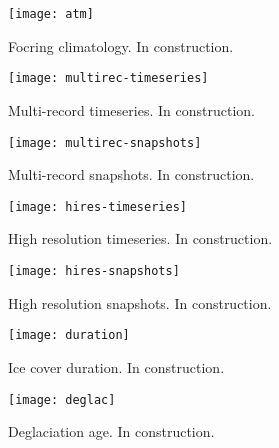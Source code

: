 \documentclass[tc, ms]{copernicus}
\begin{document}
\begin{figure}
  \texttt{[image: atm]}
  \caption{Focring climatology. In construction.}
  \label{fig:atm}
\end{figure}

\begin{figure}
  \texttt{[image: multirec-timeseries]}
  \caption{Multi-record timeseries. In construction.}
  \label{fig:multirec-timeseries}
\end{figure}

\begin{figure}
  \texttt{[image: multirec-snapshots]}
  \caption{Multi-record snapshots. In construction.}
  \label{fig:multirec-snapshots}
\end{figure}

\begin{figure}
  \texttt{[image: hires-timeseries]}
  \caption{High resolution timeseries. In construction.}
  \label{fig:hires-timeseries}
\end{figure}

\begin{figure}
  \texttt{[image: hires-snapshots]}
  \caption{High resolution snapshots. In construction.}
  \label{fig:hires-snapshots}
\end{figure}

\begin{figure}
  \texttt{[image: duration]}
  \caption{Ice cover duration. In construction.}
  \label{fig:duration}
\end{figure}

\begin{figure}
  \texttt{[image: deglac]}
  \caption{Deglaciation age. In construction.}
  \label{fig:deglac}
\end{figure}

\end{document}
